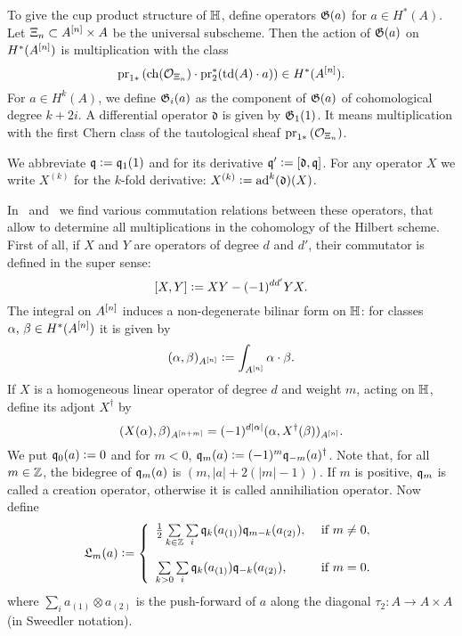 \begin{definition}
To give the cup product structure of $\mathbb{H}$, define operators $\mathfrak{G}(a)$ for $a \in H^*(A)$. Let $\Xi_n \subset A^{[n]}\times A$ be the universal subscheme. Then the action of $\mathfrak{G}(a)$ on $H^*(A^{[n]})$ is multiplication with the class
$$
\operatorname{pr}_{1*}\left( \operatorname{ch}(\mathcal{O}_{\Xi_n})\cdot \operatorname{pr}_2^*(\operatorname{td}(A)\cdot a) \right) \in H^*(A^{[n]}).
$$
For $a \in H^k(A)$, we define $\mathfrak{G}_i(a)$ as the component of $\mathfrak{G}(a)$ of cohomological degree $k+2i$. A differential operator $\mathfrak{d}$ is given by $\mathfrak{G}_1(1)$. It means multiplication with the first Chern class of the tautological sheaf $\operatorname{pr}_{1*}\left( \mathcal{O}_{\Xi_n}\right)$.
\end{definition}
\begin{notation} 
We abbreviate $\mathfrak{q} \vcentcolon=  \mathfrak{q}_1(1)$ and for its derivative $\mathfrak{q}'\vcentcolon=  [\mathfrak d, \mathfrak{q}]$. For any operator $X$ we write $X^{(k)}$ for the $k$-fold derivative: $X^{(k)} \vcentcolon= \operatorname{ad}^k(\mathfrak{d}) (X)$.
\end{notation}
In~\cite{LehnSorger} and~\cite{LiQinWang} we find various commutation relations between these operators, that allow to determine all multiplications in the cohomology of the Hilbert scheme. First of all, if $X$ and $Y$ are operators of degree $d$ and $d'$, their commutator is defined in the super sense: 
$$
[X,Y] \vcentcolon=  XY - (-1)^{dd'}YX.
$$
The integral on $A^{[n]}$ induces a non-degenerate bilinar form on $\mathbb{H}$: for classes $\alpha,\,\beta\in H^*(A^{[n]})$ it is given by
$$
(\alpha,\beta)_{A^{[n]}} \vcentcolon=   \int_{A^{[n]}}\alpha\cdot\beta.
$$
If $X$ is a homogeneous linear operator of degree $d$ and weight $m$, acting on $\mathbb{H}$, define its adjont $X^\dagger$ by
$$
(X(\alpha),\beta)_{A^{[n+m]}}  = (-1)^{d|\alpha|}( \alpha , X^\dagger (\beta))_{A^{[n]}}.
$$
We put $\mathfrak{q}_0(a) \vcentcolon= 0$ and for $m<0$, $\mathfrak{q}_m(a) \vcentcolon=  (-1)^m \mathfrak{q}_{-m}(a)^\dagger$. Note that, for all $m\in\mathbb{Z}$, the bidegree of $\mathfrak{q}_m(a)$ is $(m,|a| + 2(|m|-1))$. If $m$ is positive, $\mathfrak{q}_m$ is called a creation operator, otherwise it is called annihiliation operator. Now define
$$
\mathfrak{L}_m(a) \defIs  \left\{ 
\begin{array}{ll}
 \tfrac{1}{2}\sum\limits_{k\in\Z}\sum\limits_{i}\q_k( a_{(1)})\q_{m-k}( a_{(2)}), & \text{ if } m\neq 0, \vspace{4mm}\\
 \sum\limits_{k>0}\sum\limits_{i}\q_k( a_{(1)})\q_{-k}( a_{(2)}), & \text{ if } m= 0. \\
\end{array}
\right.
$$
where $\sum_i a_{(1)}\otimes  a_{(2)}$ is the push-forward of $a$ along the diagonal $\tau_2 :A \rightarrow A\times A$ (in Sweedler notation).
